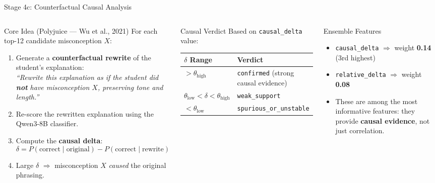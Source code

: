 ﻿\documentclass[aspectratio=169,10pt]{beamer}
\begin{document}
\begin{frame}{Stage 4c: Counterfactual Causal Analysis}
\begin{columns}[T]
\begin{block}{Core Idea (Polyjuice --- Wu et al., 2021)}
For each top-12 candidate misconception $X$:
\begin{enumerate}
  \item Generate a \textbf{counterfactual rewrite} of the student's explanation:\\
        \textit{``Rewrite this explanation as if the student did \textbf{not} have misconception $X$, preserving tone and length.''}
  \item Re-score the rewritten explanation using the Qwen3-8B classifier.
  \item Compute the \textbf{causal delta}:
        \[ \delta = P(\text{correct} \mid \text{original}) - P(\text{correct} \mid \text{rewrite}) \]
  \item Large $\delta$ $\Rightarrow$ misconception $X$ \textit{caused} the original phrasing.
\end{enumerate}
\end{block}
\begin{block}{Causal Verdict}
Based on \texttt{causal\_delta} value:
\begin{center}
\scriptsize
\begin{tabular}{ll}
\toprule
$\delta$ Range & Verdict\\
\midrule
$> \theta_{\text{high}}$ & \texttt{confirmed} (strong causal evidence)\\
$\theta_{\text{low}} < \delta < \theta_{\text{high}}$ & \texttt{weak\_support}\\
$< \theta_{\text{low}}$ & \texttt{spurious\_or\_unstable}\\
\bottomrule
\end{tabular}
\end{center}
\end{block}
\vspace{8pt}
\begin{block}{Ensemble Features}
\begin{itemize}
  \item \texttt{causal\_delta} $\Rightarrow$ weight \textbf{0.14} (3rd highest)
  \item \texttt{relative\_delta} $\Rightarrow$ weight \textbf{0.08}
  \item These are among the most informative features: they provide \textbf{causal evidence}, not just correlation.
\end{itemize}
\end{block}
\end{columns}
\end{frame}
\end{document}
